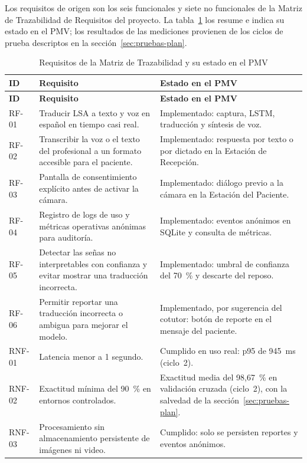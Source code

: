Los requisitos de origen son los seis funcionales y siete no funcionales de la Matriz de Trazabilidad de Requisitos del proyecto. La tabla~\ref{tab:req-oficiales} los resume e indica su estado en el PMV; los resultados de las mediciones provienen de los ciclos de prueba descriptos en la sección~\ref{sec:pruebas-plan}.

\begin{longtable}{>{\raggedright\arraybackslash}p{1.5cm} >{\raggedright\arraybackslash}p{6.0cm} >{\raggedright\arraybackslash}p{7.1cm}}
  \caption{Requisitos de la Matriz de Trazabilidad y su estado en el PMV}\label{tab:req-oficiales}\\
  \toprule
  \textbf{ID} & \textbf{Requisito} & \textbf{Estado en el PMV} \\
  \midrule
  \endfirsthead
  \toprule
  \textbf{ID} & \textbf{Requisito} & \textbf{Estado en el PMV} \\
  \midrule
  \endhead
  RF-01 & Traducir LSA a texto y voz en español en tiempo casi real. & Implementado: captura, LSTM, traducción y síntesis de voz. \\
  RF-02 & Transcribir la voz o el texto del profesional a un formato accesible para el paciente. & Implementado: respuesta por texto o por dictado en la Estación de Recepción. \\
  RF-03 & Pantalla de consentimiento explícito antes de activar la cámara. & Implementado: diálogo previo a la cámara en la Estación del Paciente. \\
  RF-04 & Registro de logs de uso y métricas operativas anónimas para auditoría. & Implementado: eventos anónimos en SQLite y consulta de métricas. \\
  RF-05 & Detectar las señas no interpretables con confianza y evitar mostrar una traducción incorrecta. & Implementado: umbral de confianza del 70~\% y descarte del reposo. \\
  RF-06 & Permitir reportar una traducción incorrecta o ambigua para mejorar el modelo. & Implementado, por sugerencia del cotutor: botón de reporte en el mensaje del paciente. \\
  RNF-01 & Latencia menor a 1 segundo. & Cumplido en uso real: p95 de 945~ms (ciclo~2). \\
  RNF-02 & Exactitud mínima del 90~\% en entornos controlados. & Exactitud media del 98,67~\% en validación cruzada (ciclo~2), con la salvedad de la sección~\ref{sec:pruebas-plan}. \\
  RNF-03 & Procesamiento sin almacenamiento persistente de imágenes ni video. & Cumplido: solo se persisten reportes y eventos anónimos. \\

\end{longtable}
